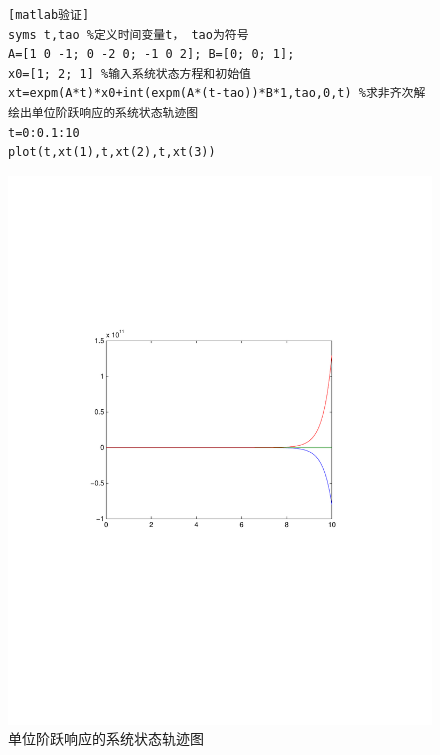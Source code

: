 \documentclass[a4paper]{article}
\begin{document}
\begin{figure}[htbp]
\begin{minipage}[c]{0.45\textwidth}
\begin{verbatim}[matlab验证]
syms t,tao %定义时间变量t， tao为符号
A=[1 0 -1; 0 -2 0; -1 0 2]; B=[0; 0; 1];
x0=[1; 2; 1] %输入系统状态方程和初始值
xt=expm(A*t)*x0+int(expm(A*(t-tao))*B*1,tao,0,t) %求非齐次解
绘出单位阶跃响应的系统状态轨迹图
t=0:0.1:10
plot(t,xt(1),t,xt(2),t,xt(3))
\end{verbatim}
\end{minipage}
\begin{minipage}[c]{0.5\textwidth}
\caption{单位阶跃响应的系统状态轨迹图}
\includegraphics[width=\textwidth]{num2} 
\end{minipage}
\end{figure}
\end{document}

